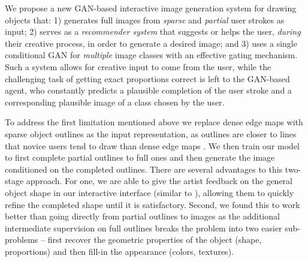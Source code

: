 We propose a new GAN-based interactive image generation system for drawing objects that: 1) generates full images from {\em sparse} and {\em partial} user strokes as input; 2) serves as a \emph{recommender system} that suggests or helps the user, \emph{during} their creative process, in order to generate a desired image; and 3) uses a single conditional GAN for {\em multiple} image classes with an effective gating mechanism. Such a system allows for creative input to come from the user, while the challenging task of getting exact proportions correct is left to the GAN-based agent, who constantly predicts a plausible completion of the user stroke and a corresponding plausible image of a class chosen by the user. 

To address the first limitation mentioned above we replace dense edge maps with sparse object outlines as the input representation, as outlines are closer to lines that novice users tend to draw than dense edge maps \cite{cole2008people}. We then train our model to first complete partial outlines to full ones and then generate the image conditioned on the completed outlines. 
There are several advantages to this two-stage approach.
For one, we are able to give the artist feedback on the general object shape in our interactive interface (similar to \cite{lee2011shadowdraw}), allowing them to quickly refine the completed shape until it is satisfactory.
Second, we found this to work better than going directly from partial outlines to images as the additional intermediate supervision on full outlines breaks the problem into two easier sub-problems -- first recover the geometric properties of the object (shape, proportions) and then fill-in the appearance (colors, textures). 




